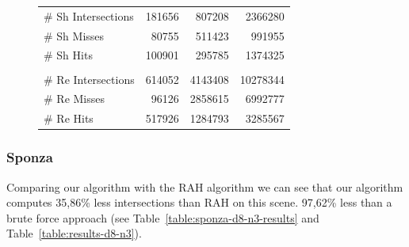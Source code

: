 \begin{figure}[!htb]
\begin{minipage}{0.725\linewidth}
\begin{tabular}[h]{l|rrr}
            \quad \# Sh Intersections   & 181656 & 807208  & 2366280	\\
            \quad \# Sh Misses          & 80755	 & 511423  & 991955		\\
            \quad \# Sh Hits            & 100901 & 295785  & 1374325	\\
            & & \\
            \quad \# Re Intersections   & 614052 & 4143408 & 10278344	\\
            \quad \# Re Misses             & 96126	 & 2858615 & 6992777	\\
            \quad \# Re Hits               & 517926 & 1284793 & 3285567	\\            
        \end{tabular}
        \label{table:cornell-d8-n3-results}
    \end{minipage}
\end{figure}

\subsubsection{Sponza}


Comparing our algorithm with the RAH algorithm we can see that our algorithm computes 35,86\% less intersections than RAH on this scene. 97,62\% less than a brute force approach (see Table~\ref{table:sponza-d8-n3-results} and Table~\ref{table:results-d8-n3}).


